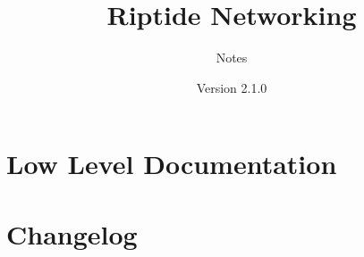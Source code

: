 \documentclass[12pt,pdftex,a4paper]{scrbook}
\begin{document}
	\thispagestyle{empty}
	\title{Riptide Networking}
	\subtitle{Notes}
	\author{Version 2.1.0}
	\maketitle
	
	\newpage
	\tableofcontents
	
	\part{Low Level Documentation}
	
	
	
	
	\part{Changelog}
	
	
	
\end{document}
